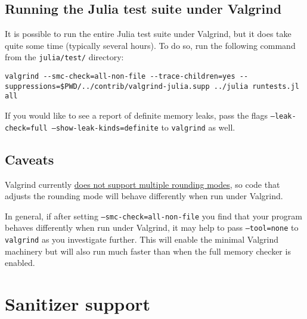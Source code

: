 \hypertarget{10173787738831416739}{}


\subsection{Running the Julia test suite under Valgrind}



It is possible to run the entire Julia test suite under Valgrind, but it does take quite some time (typically several hours).  To do so, run the following command from the \texttt{julia/test/} directory:




\begin{lstlisting}
valgrind --smc-check=all-non-file --trace-children=yes --suppressions=$PWD/../contrib/valgrind-julia.supp ../julia runtests.jl all
\end{lstlisting}



If you would like to see a report of {\textquotedbl}definite{\textquotedbl} memory leaks, pass the flags \texttt{--leak-check=full --show-leak-kinds=definite} to \texttt{valgrind} as well.



\hypertarget{11463604234155946056}{}


\subsection{Caveats}



Valgrind currently \href{https://bugs.kde.org/show\_bug.cgi?id=136779}{does not support multiple rounding modes}, so code that adjusts the rounding mode will behave differently when run under Valgrind.



In general, if after setting \texttt{--smc-check=all-non-file} you find that your program behaves differently when run under Valgrind, it may help to pass \texttt{--tool=none} to \texttt{valgrind} as you investigate further.  This will enable the minimal Valgrind machinery but will also run much faster than when the full memory checker is enabled.



\hypertarget{7868060637958278195}{}


\section{Sanitizer support}



